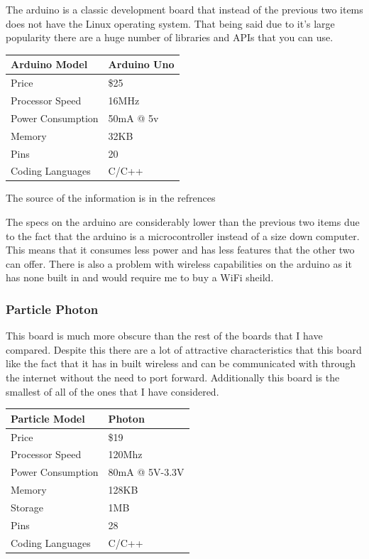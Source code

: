 \documentclass{article}
\begin{document}
The arduino is a classic development board that instead of the previous two items does not have the Linux
operating system. That being said due to it's large popularity there are a huge number of libraries and
APIs that you can use. \\

\begin{tabularx}{\textwidth}{| X | X |}
    \hline
    Arduino Model    &   Arduino Uno \\ \hline
    Price            &       \$25    \\ \hline
    Processor Speed  &      16MHz    \\ \hline
    Power Consumption&    50mA @ 5v  \\ \hline
    Memory           &      32KB     \\ \hline
    Pins             &       20      \\ \hline
    Coding Languages &     C/C++     \\ \hline
\end{tabularx}
\newline

The source of the information is in the refrences\cite{ardino}
\newline

The specs on the arduino are considerably lower than the previous two items due to the fact that
the arduino is a microcontroller instead of a size down computer. This means that it consumes less
power and has less features that the other two can offer. There is also a problem with wireless
capabilities on the arduino as it has none built in and would require me to buy a WiFi sheild.

\subsubsection{Particle Photon}

This board is much more obscure than the rest of the boards that I have compared. Despite this there
are a lot of attractive characteristics that this board like the fact that it has in built wireless
and can be communicated with through the internet without the need to port forward. Additionally this
board is the smallest of all of the ones that I have considered. \\

\begin{tabularx}{\textwidth}{| X | X |}
    \hline
    Particle Model   &    Photon     \\ \hline
    Price            &     \$19      \\ \hline
    Processor Speed  &    120Mhz     \\ \hline
    Power Consumption& 80mA @ 5V-3.3V\\ \hline
    Memory           &    128KB      \\ \hline
    Storage          &     1MB       \\ \hline
    Pins             &     28        \\ \hline
    Coding Languages &    C/C++      \\ \hline
\end{tabularx}
\newline
\end{document}
